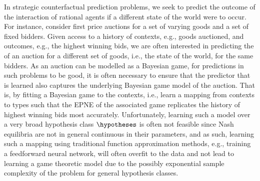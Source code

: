In strategic counterfactual prediction problems, we seek to predict the outcome of the interaction of rational agents if a different state of the world were to occur. For instance, consider first price auctions for a set of varying goods and a set of fixed bidders. Given access to a history of contexts, e.g., goods auctioned, and outcomes, e.g., the highest winning bids, we are often interested in predicting the    of an auction for a different set of goods, i.e., the state of the world, for the same bidders. As an auction can be modelled as a Bayesian game, for predictions in such problems to be good, it is often necessary to ensure that the predictor that is learned also captures the underlying Bayesian game model of the auction. That is, by fitting a Bayesian game to the contexts, i.e., learn a mapping from contexts to types such that the EPNE of the associated game replicates the history of highest winning bids most accurately. Unfortunately, learning such a model over a very broad hypothesis class $\hypotheses$ is often not feasible since Nash equilibria are not in general continuous in their parameters,  and as such, learning such a mapping using traditional function approximation methods, e.g., training a feedforward neural network, will often overfit to the data and not lead to learning a game theoretic model due to the possibly exponential sample complexity of the problem for general hypothesis classes. 


